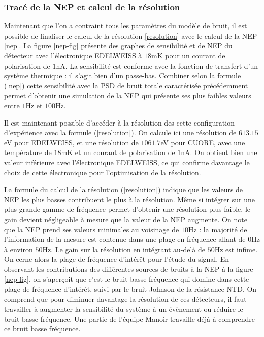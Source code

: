 \subsubsection{Tracé de la NEP et calcul de la résolution}
\label{nep-res}

Maintenant que l'on a contraint tous les paramètres du modèle de bruit, il est possible de finaliser le calcul de la résolution \ref{resolution} avec le calcul de la NEP \ref{nep}. La figure \ref{nep-fig} présente des graphes de sensibilité et de NEP du détecteur avec l'électronique EDELWEISS à $18$mK pour un courant de polarisation de $1$nA. La sensibilité est conforme avec la fonction de transfert d'un système thermique : il s'agit bien d'un passe-bas. Combiner selon la formule (\ref{nep}) cette sensibilité avec la PSD de bruit totale caractérisée précédemment permet d'obtenir une simulation de la NEP qui présente ses plus faibles valeurs entre $1$Hz et $100$Hz. 


Il est maintenant possible d'accéder à la résolution des cette configuration d'expérience avec la formule (\ref{resolution}). On calcule ici une résolution de $613.15$eV pour EDELWEISS, et une résolution de $1061.7$eV pour CUORE, avec une température de $18$mK et un courant de polarisation de $1$nA. On obtient bien une valeur inférieure avec l'électronique EDELWEISS, ce qui confirme davantage le choix de cette électronique pour l'optimisation de la résolution.

La formule du calcul de la résolution (\ref{resolution}) indique que les valeurs de NEP les plus basses contribuent le plus à la résolution. Même si intégrer sur une plus grande gamme de fréquence permet d'obtenir une résolution plus faible, le gain devient négligeable à mesure que la valeur de la NEP augmente.
On note que la NEP prend ses valeurs minimales au voisinage de $10$Hz : la majorité de l'information de la mesure est contenue dans une plage en fréquence allant de $0$Hz à environ $50$Hz. Le gain sur la résolution en intégrant au-delà de $50$Hz est infime. On cerne alors la plage de fréquence d'intérêt pour l'étude du signal. En observant les contributions des différentes sources de bruits à la NEP à la figure \ref{nep-fig}, on s'aperçoit que c'est le bruit basse fréquence qui domine dans cette plage de fréquence d'intérêt, suivi par le bruit Johnson de la résistance NTD. On comprend que pour diminuer davantage la résolution de ces détecteurs, il faut travailler à augmenter la sensibilité du système à un évènement ou réduire le bruit basse fréquence. Une partie de l'équipe Manoir travaille déjà à comprendre ce bruit basse fréquence.

